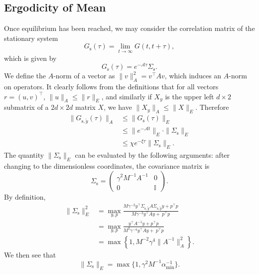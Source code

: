 \documentclass[prx,onecolumn,floatfix,longbibliography,notitlepage, nofootinbib,12pt]{revtex4-2}
\renewcommand{\leq}{\leqslant}
\begin{document}
\begin{appendix}
\subsection{Ergodicity of Mean}
Once equilibrium has been reached, we may consider the correlation matrix of the stationary system
\begin{equation}
    G_\text{s}(\tau) = \lim_{t\to\infty}G(t,t+\tau),
\end{equation}
which is given by
\begin{equation}
    G_\text{s}(\tau) = e^{-\mathcal{A} \tau}\Sigma_\text{s}.
\end{equation}
We define the $A$-norm of a vector as $\|v\|_A ^2 = v^\intercal A v$, which induces an $A$-norm on operators. It clearly follows from the definitions that for all vectors $r = (u, v)^\intercal$, $\|u\|_A \leq \|r\|_E$, and similarly if $X_{y}$ is the upper left $d \times 2$ submatrix of a $2  d \times 2d$ matrix $X$, we have $\|X_{y}\|_A \leq \|X\|_E$.
Therefore
\begin{align}
    \|G_{\text{s},\tilde{y}}(\tau)\|_A &\leq \|G_\text{s}(\tau)\|_E\\
    & \leq \|e^{-\mathcal{A} t}\|_E \cdot \| \Sigma_\text{s}\|_E \\
    & \leq  \chi e^{-\xi \tau} \|\Sigma_\text{s}\|_E.
\end{align}
The quantity $\|\Sigma_\text{s}\|_E$ can be evaluated by the following arguments: after changing to the dimensionless coordinates, the covariance matrix is
\begin{equation}
    \Sigma_\text{s} = 
    \begin{pmatrix}
        \gamma^2 M^{-1} A^{-1} & 0\\
        0 & \mathbb{I}
    \end{pmatrix}.
\end{equation}
By definition,
\begin{align}
    \|\Sigma_\text{s}\|_E^2 &= \max_{y,p} \frac{ M \gamma^{-2}y^\intercal \Sigma_{\text{s},\tilde{y}} A \Sigma_{\text{s},\tilde{y}} y  + p^\intercal p}{M \gamma^{-2} y^\intercal A y + \ p^\intercal p} \\
    & = 
    \max_{y,p} \frac{ y^\intercal  A^{-1}y  + p^\intercal p}{M^2 \gamma^{-4} y^\intercal A y + \ p^\intercal p} \\
    & = 
    \max\left\{1, M^{-2}\gamma^{4}\|A^{-1}\|_A^2\right\}.
\end{align}
We then see that
\begin{equation}
    \|\Sigma_\text{s}\|_E = \max\{1, \gamma^{2} M^{-1} \alpha_\text{min}^{-1}\}.

\end{equation}
\end{appendix}
\end{document}

